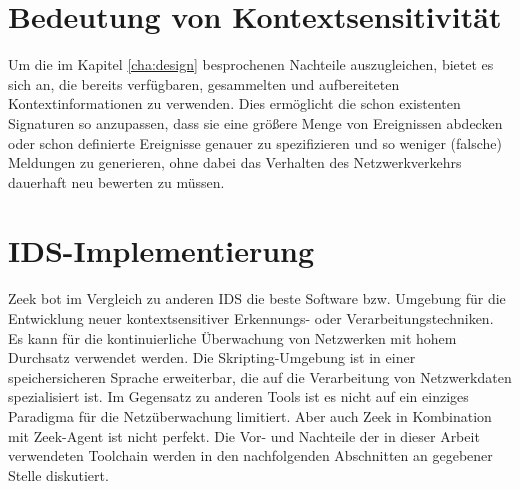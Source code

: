 \section{Bedeutung von Kontextsensitivität}
Um die im Kapitel \ref{cha:design} besprochenen Nachteile auszugleichen, bietet es sich an, die bereits verfügbaren, gesammelten und aufbereiteten Kontextinformationen zu verwenden. Dies ermöglicht die schon existenten Signaturen so anzupassen, dass sie eine größere Menge von Ereignissen abdecken oder schon definierte Ereignisse genauer zu spezifizieren und so weniger (falsche) Meldungen zu generieren, ohne dabei das Verhalten des Netzwerkverkehrs dauerhaft neu bewerten zu müssen.
\section{IDS-Implementierung}
Zeek bot im Vergleich zu anderen IDS die beste Software bzw. Umgebung für die Entwicklung neuer kontextsensitiver Erkennungs- oder Verarbeitungstechniken. Es kann für die kontinuierliche Überwachung von Netzwerken mit hohem Durchsatz verwendet werden. Die Skripting-Umgebung ist in einer speichersicheren Sprache erweiterbar, die auf die Verarbeitung von Netzwerkdaten spezialisiert ist. Im Gegensatz zu anderen Tools ist es nicht auf ein einziges Paradigma für die Netzüberwachung limitiert.
Aber auch Zeek in Kombination mit Zeek-Agent ist nicht perfekt. Die Vor- und Nachteile der in dieser Arbeit verwendeten Toolchain werden in den nachfolgenden Abschnitten an gegebener Stelle diskutiert.
